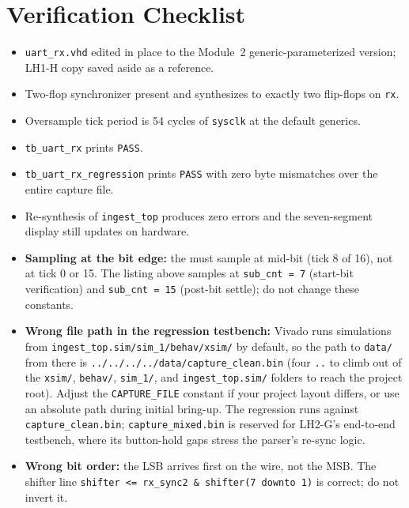 \documentclass[11pt,letterpaper]{article}
\begin{document}
\section{Verification Checklist}
\begin{itemize}[leftmargin=2em]
	\item[$\square$] \texttt{uart\_rx.vhd} edited in place to the Module~2 generic-parameterized version; LH1-H copy saved aside as a reference.
	\item[$\square$] Two-flop synchronizer present and synthesizes to exactly two flip-flops on \texttt{rx}.
	\item[$\square$] Oversample tick period is 54 cycles of \texttt{sysclk} at the default generics.
	\item[$\square$] \texttt{tb\_uart\_rx} prints \texttt{PASS}.
	\item[$\square$] \texttt{tb\_uart\_rx\_regression} prints \texttt{PASS} with zero byte mismatches over the entire capture file.
	\item[$\square$] Re-synthesis of \texttt{ingest\_top} produces zero errors and the seven-segment display still updates on hardware.
\end{itemize}

\begin{tcolorbox}[warning={Common Pitfalls}]
	\begin{itemize}[leftmargin=1.2em]
		\item \textbf{Sampling at the bit edge:} the \FSM{} must sample at mid-bit (tick 8 of 16), not at tick 0 or 15. The listing above samples at \texttt{sub\_cnt = 7} (start-bit verification) and \texttt{sub\_cnt = 15} (post-bit settle); do not change these constants.
		\item \textbf{Wrong file path in the regression testbench:} Vivado runs simulations from \texttt{ingest\_top.sim/sim\_1/behav/xsim/} by default, so the path to \texttt{data/} from there is \texttt{../../../../data/capture\_clean.bin} (four \texttt{..} to climb out of the \texttt{xsim/}, \texttt{behav/}, \texttt{sim\_1/}, and \texttt{ingest\_top.sim/} folders to reach the project root). Adjust the \texttt{CAPTURE\_FILE} constant if your project layout differs, or use an absolute path during initial bring-up. The regression runs against \texttt{capture\_clean.bin}; \texttt{capture\_mixed.bin} is reserved for LH2-G's end-to-end testbench, where its button-hold gaps stress the parser's re-sync logic.
		\item \textbf{Wrong bit order:} the \mbox{LSB} arrives first on the wire, not the \mbox{MSB}. The shifter line \texttt{shifter <= rx\_sync2 \& shifter(7 downto 1)} is correct; do not invert it.
	\end{itemize}
\end{tcolorbox}
\end{document}
